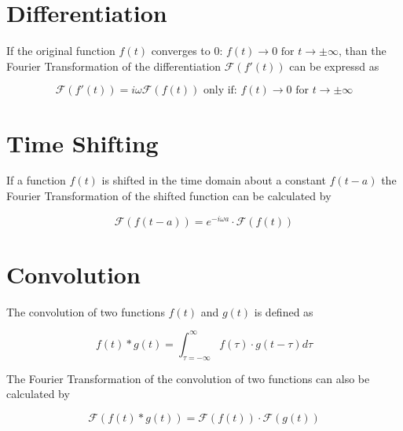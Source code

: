 \documentclass[./\jobname.tex]{subfiles}
\begin{document}
\section{Differentiation}
If the original function $f(t)$ converges to $0$: $f(t) \rightarrow 0 \text{ for } t \rightarrow \pm \infty$, than the Fourier Transformation of the differentiation $\mathcal{F}(f'(t))$ can be expressd as 

\begin{equation}
	\mathcal{F}(f'(t)) = i \omega \mathcal{F}(f(t)) \text{ only if: } f(t) \rightarrow 0 \text{ for } t \rightarrow \pm \infty
\end{equation}


\section{Time Shifting}
If a function $f(t)$ is shifted in the time domain about a constant $f(t-a)$ the Fourier Transformation of the shifted function can be calculated by

\begin{equation}
	\mathcal{F}(f(t - a)) = e^{-i\omega a} \cdot \mathcal{F}(f(t))
\end{equation}

\section{Convolution}

The convolution of two functions $f(t)$ and $g(t)$ is defined as 

\begin{equation}
	f(t) \ast g(t) = \int_{\tau = - \infty}^{\infty} f(\tau) \cdot g(t-\tau) d\tau
\end{equation}

The Fourier Transformation of the convolution of two functions can also be calculated by 

\begin{equation}
	\mathcal{F}(f(t) \ast g(t)) = \mathcal{F}(f(t)) \cdot \mathcal{F}(g(t))
\end{equation}
\end{document}
